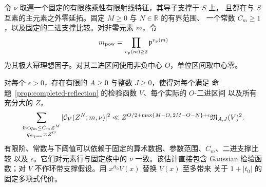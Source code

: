 \begin{lemma}[无标记完备化行矩]
\label{lem:unmarked-completed-moment}
令 $\nu$ 取遍一个固定的有限族乘性有限射线特征，其导子支撑于 $S$ 上，
且都在与 $S$ 互素的主元素之外零延拓。固定 $M\ge0$ 与 $N\in\mathbb R$ 的有界范围、
一个常数 $C_m\ge1$，以及固定的二进支撑比较。对非零元素 $m$，令
\[
 m_{\rm pow}=\prod_{v_{\mathfrak p}(m)\ge2}
                 \mathfrak p^{v_{\mathfrak p}(m)}
\]
为其极大幂理想因子。对其二进区间使用非负中心 $O$，单位区间取中心零。

对每个 $\epsilon>0$，存在有限的 $A\ge0$ 与整数 $J\ge0$，使得对每个满足
命题~\ref{prop:completed-reflection} 的检验函数 $V$、每个实际的 $O$-二进区间
以及所有充分大的 $Z$，
\begin{equation}\label{eq:unmarked-completed-moment}
 \sum_{\substack{0<q_m\le C_mZ^M\\q_{m_{\rm pow}}\asymp Z^O}}
       |\mathcal C_V(Z^N;m,\nu)|^2
 \ll Z^{O/2+\max\{M-O,\,2M-O-N\}+\epsilon}
       \mathfrak M_{A,J}(V)^2.
\end{equation}
有限阶、常数与下阈值可以依赖于固定的算术数据、参数范围、$C_m$、二进支撑比较
以及 $\epsilon$。它们对元素行与固定族中的 $\nu$ 一致。该估计直接包含 Gaussian
检验函数；对 $V$ 不作环带支撑假设。用 $x^{it_0}V(x)$ 替换 $V(x)$ 至多带来
关于 $1+|t_0|$ 的固定多项式代价。
\end{lemma}

